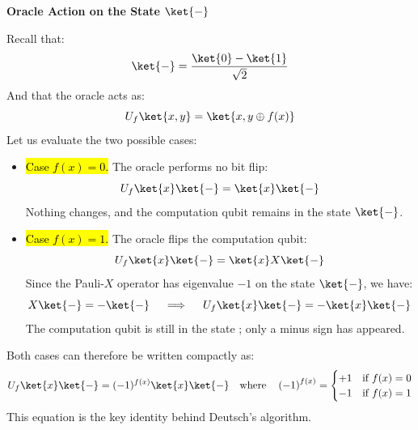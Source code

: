 \highspace
\begin{flushleft}
    \textcolor{Green3}{ \textbf{Oracle Action on the State $\ket{-}$}}
\end{flushleft}
Recall that:
\begin{equation*}
    \ket{-} = \frac{\ket{0} - \ket{1}}{\sqrt{2}}
\end{equation*}
And that the oracle acts as:
\begin{equation*}
    U_f \ket{x,y} = \ket{x, y \oplus f(x)}
\end{equation*}
Let us evaluate the two possible cases:
\begin{itemize}
    \item \hl{Case $f(x) = 0$.} The oracle performs no bit flip:
    \begin{equation*}
        U_f \ket{x}\ket{-} = \ket{x}\ket{-}
    \end{equation*}
    Nothing changes, and the computation qubit remains in the state $\ket{-}$.

    
    \item \hl{Case $f(x) = 1$.} The oracle flips the computation qubit:
    \begin{equation*}
        U_f \ket{x}\ket{-} = \ket{x} X\ket{-}
    \end{equation*}
    Since the Pauli-$X$ operator has eigenvalue $-1$ on the state $\ket{-}$, we have:
    \begin{equation*}
        X\ket{-} = -\ket{-}
        \quad \implies \quad
        U_f \ket{x}\ket{-} = -\ket{x}\ket{-}
    \end{equation*}
    The computation qubit is still in the state \ket{-}; only a minus sign has appeared.
\end{itemize}
Both cases can therefore be written compactly as:
\begin{equation}
    U_f \ket{x}\ket{-} = (-1)^{f(x)} \ket{x}\ket{-} \quad \text{where} \quad \left(-1\right)^{f(x)} = \begin{cases}
        +1 & \text{if } f(x) = 0 \\
        -1 & \text{if } f(x) = 1
    \end{cases}
\end{equation}
This equation is the key identity behind Deutsch's algorithm.

